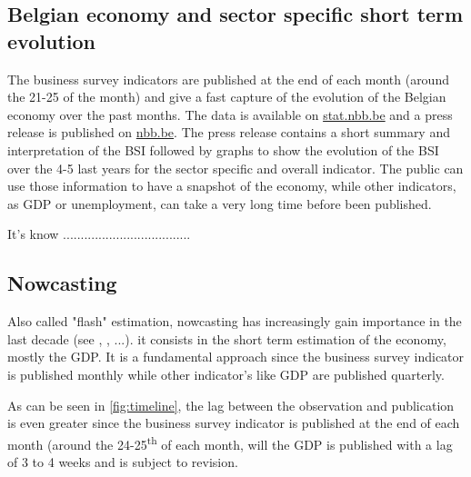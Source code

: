 \documentclass[12pt,a4paper,oneside]{book}
\begin{document}
\subsection{Belgian economy and sector specific short term evolution}


The business survey indicators are published at the end of each month (around the 21-25 of the month) and give a fast capture of the evolution of the Belgian economy over the past months.
The data is available on \href{http://stat.nbb.be/Index.aspx?DataSetCode=BUSSURVM&Lang=en}{stat.nbb.be} and a press release is published on \href{http://www.nbb.be/doc/dq/e/conj.htm}{nbb.be}. 
The press release contains a short summary and interpretation of the BSI followed by graphs to show the evolution of the BSI over the 4-5 last years for the sector specific and overall indicator.
The public can use those information to have a snapshot of the economy, while other indicators, as GDP or unemployment, can take a very long time before been published.

It's know ....................................




\subsection{Nowcasting}

Also called "flash" estimation, nowcasting has increasingly gain importance in the last decade (see \cite{foroni_comparison_2014}, \cite{de_antonio_liedo_nowcasting_2014}, ...).
it consists in the short term estimation of the economy, mostly the GDP.
It is a fundamental approach since the business survey indicator is published monthly while other indicator's like GDP are published quarterly.

As can be seen in \autoref{fig:timeline}, 
the lag between the observation and publication is even greater since the business survey indicator is published at the end of each month (around the 24-25\textsuperscript{th} of each month, will the GDP is published with a lag of 3 to 4 weeks and is subject to revision.
\end{document}
